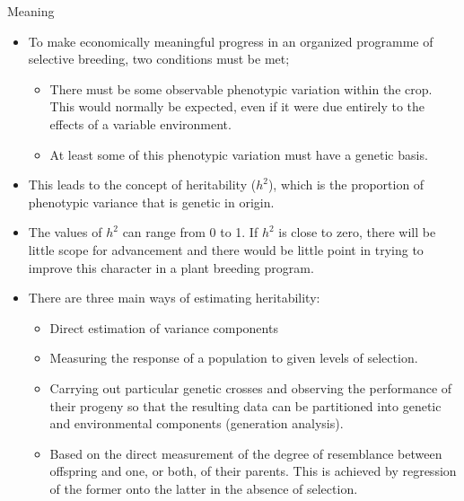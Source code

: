 \documentclass[11pt,ignorenonframetext,aspectratio=169]{beamer}
\providecommand{\tightlist}{%
  \setlength{\itemsep}{0pt}\setlength{\parskip}{0pt}}
\begin{document}
\begin{frame}{Meaning}
\protect\hypertarget{meaning}{}
\small

\begin{itemize}
\tightlist
\item
  To make economically meaningful progress in an organized programme of
  selective breeding, two conditions must be met;

  \begin{itemize}
  \footnotesize
  \item There must be some observable phenotypic variation within the crop. This would normally be expected, even if it were due entirely to the effects of a variable environment.
  \item At least some of this phenotypic variation must have a genetic basis.
  \end{itemize}
\item
  This leads to the concept of heritability (\(h^2\)), which is the
  proportion of phenotypic variance that is genetic in origin.
\item
  The values of \(h^2\) can range from 0 to 1. If \(h^2\) is close to
  zero, there will be little scope for advancement and there would be
  little point in trying to improve this character in a plant breeding
  program.
\end{itemize}
\end{frame}

\begin{frame}{}
\protect\hypertarget{section-7}{}
\begin{itemize}
\tightlist
\item
  There are three main ways of estimating heritability:

  \begin{itemize}
  \footnotesize
  \item Direct estimation of variance components
  \item Measuring the response of a population to given levels of selection.
  \item Carrying out particular genetic crosses and observing the performance of their progeny so that the resulting data can be partitioned into genetic and environmental components (generation analysis).
  \item Based on the direct measurement of the degree of resemblance between offspring and one, or both, of their parents. This is achieved by regression of the former onto the latter in the absence of selection.
  \end{itemize}
\end{itemize}
\end{frame}
\end{document}
